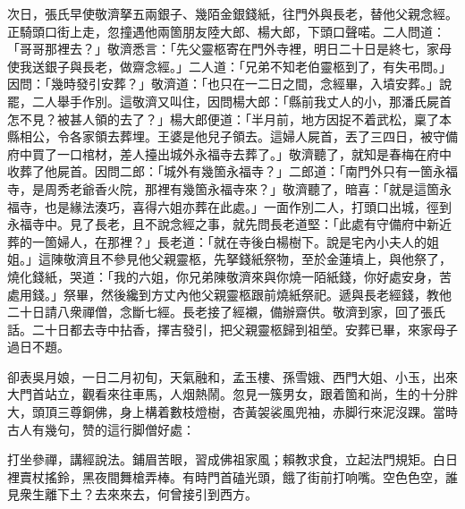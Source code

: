 次日，張氏早使敬濟拏五兩銀子、幾陌金銀錢紙，往門外與長老，替他父親念經。正騎頭口街上走，忽撞遇他兩箇朋友陸大郎、楊大郎，下頭口聲喏。二人問道：「哥哥那裡去？」敬濟悉言：「先父靈柩寄在門外寺裡，明日二十日是終七，家母使我送銀子與長老，做齋念經。」二人道：「兄弟不知老伯靈柩到了，有失弔問。」因問：「幾時發引安葬？」敬濟道：「也只在一二日之間，念經畢，入墳安葬。」說罷，二人舉手作別。這敬濟又叫住，因問楊大郎：「縣前我丈人的小，那潘氏屍首怎不見？被甚人領的去了？」楊大郎便道：「半月前，地方因捉不着武松，稟了本縣相公，令各家領去葬埋。王婆是他兒子領去。這婦人屍首，丟了三四日，被守備府中買了一口棺材，差人擡出城外永福寺去葬了。」敬濟聽了，就知是春梅在府中收葬了他屍首。因問二郎：「城外有幾箇永福寺？」二郎道：「南門外只有一箇永福寺，是周秀老爺香火院，那裡有幾箇永福寺來？」敬濟聽了，暗喜：「就是這箇永福寺，也是緣法湊巧，喜得六姐亦葬在此處。」一面作別二人，打頭口出城，徑到永福寺中。見了長老，且不說念經之事，就先問長老道堅：「此處有守備府中新近葬的一箇婦人，在那裡？」長老道：「就在寺後白楊樹下。說是宅內小夫人的姐姐。」這陳敬濟且不參見他父親靈柩，{}先拏錢紙祭物，至於金蓮墳上，與他祭了，燒化錢紙，哭道：「我的六姐，你兄弟陳敬濟來與你燒一陌紙錢，你好處安身，苦處用錢。」祭畢，然後纔到方丈內他父親靈柩跟前燒紙祭祀。遞與長老經錢，教他二十日請八衆禪僧，念斷七經。長老接了經襯，備辦齋供。敬濟到家，回了張氏話。二十日都去寺中拈香，擇吉發引，把父親靈柩歸到祖塋。安葬已畢，來家母子過日不題。

卻表吳月娘，一日二月初旬，天氣融和，孟玉樓、孫雪娥、西門大姐、小玉，出來大門首站立，觀看來往車馬，人烟熱鬧。忽見一簇男女，跟着箇和尚，生的十分胖大，頭頂三尊銅佛，身上構着數枝燈樹，杏黃袈裟風兜袖，赤脚行來泥沒踝。當時古人有幾句，赞的這行脚僧好處：

\begin{myquote}
打坐參禪，講經說法。鋪眉苦眼，習成佛祖家風；賴教求食，立起法門規矩。白日裡賣杖搖鈴，黑夜間舞槍弄棒。有時門首磕光頭，餓了街前打响嘴。空色色空，誰見衆生離下土？去來來去，何曾接引到西方。
\end{myquote}

